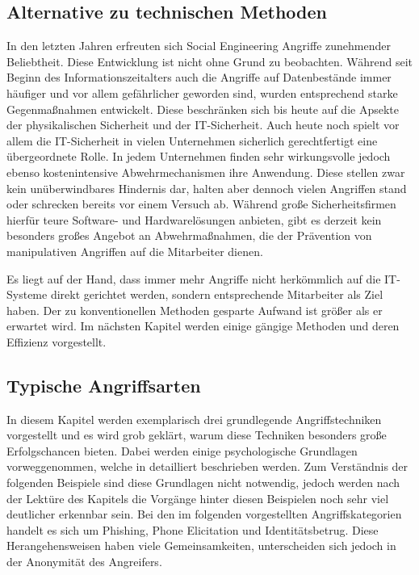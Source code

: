 \subsection{Alternative zu technischen Methoden}\label{sec:alternative_zu_technischen_methoden}
In den letzten Jahren erfreuten sich Social Engineering Angriffe zunehmender Beliebtheit.
Diese Entwicklung ist nicht ohne Grund zu beobachten.
Während seit Beginn des Informationszeitalters auch die Angriffe auf Datenbestände immer häufiger und
vor allem gefährlicher geworden sind, wurden entsprechend starke Gegenmaßnahmen entwickelt.
Diese beschränken sich bis heute auf die Apsekte der physikalischen Sicherheit und der IT-Sicherheit.
Auch heute noch spielt vor allem die IT-Sicherheit in vielen Unternehmen sicherlich gerechtfertigt
eine übergeordnete Rolle.
In jedem Unternehmen finden sehr wirkungsvolle jedoch ebenso kostenintensive Abwehrmechanismen ihre Anwendung.
Diese stellen zwar kein unüberwindbares Hindernis dar, halten aber dennoch vielen Angriffen stand oder
schrecken bereits vor einem Versuch ab.
Während große Sicherheitsfirmen hierfür teure Software- und Hardwarelösungen anbieten, gibt es derzeit
kein besonders großes Angebot an Abwehrmaßnahmen, die der Prävention von manipulativen Angriffen auf
die Mitarbeiter dienen. \citep{hacking-the-human}

Es liegt auf der Hand, dass immer mehr Angriffe nicht herkömmlich auf die IT-Systeme direkt
gerichtet werden, sondern entsprechende Mitarbeiter als Ziel haben.
Der zu konventionellen Methoden gesparte Aufwand ist größer als er erwartet wird.
Im nächsten Kapitel werden einige gängige Methoden und deren Effizienz vorgestellt.

\subsection{Typische Angriffsarten}\label{sec:gangige_angriffe}
In diesem Kapitel werden exemplarisch drei grundlegende Angriffstechniken vorgestellt und es wird grob geklärt, warum diese Techniken besonders große Erfolgschancen bieten.
Dabei werden einige psychologische Grundlagen vorweggenommen, welche in  detailliert
beschrieben werden.
Zum Verständnis der folgenden Beispiele sind diese Grundlagen nicht notwendig, jedoch werden nach der
Lektüre des Kapitels  die Vorgänge hinter diesen Beispielen noch sehr viel deutlicher erkennbar sein.
Bei den im folgenden vorgestellten Angriffskategorien handelt es sich um Phishing, Phone Elicitation und Identitätsbetrug. Diese Herangehensweisen haben viele Gemeinsamkeiten, unterscheiden sich jedoch in der Anonymität des Angreifers.


